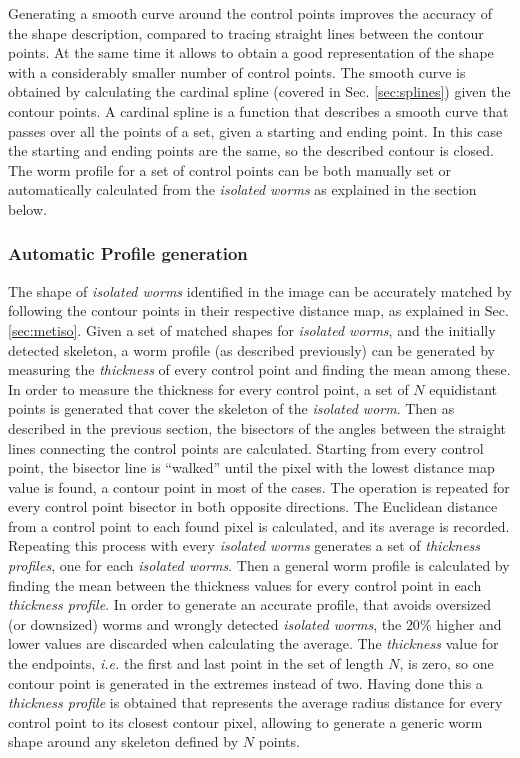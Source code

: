 Generating a smooth curve around the control points improves the accuracy of the shape
description, compared to tracing straight lines
between the contour points. At the same time it allows to obtain a good representation
of the shape with a considerably smaller number of control points. The smooth curve
is obtained by calculating the cardinal spline (covered in Sec. \ref{sec:splines}) given the
contour points. A cardinal spline is a function that describes a smooth curve that
passes over all the points of a set, given a starting and ending point. In this case
the starting and ending points are the same, so the described contour is closed.\\

The worm profile for a set of control points can be both manually set or automatically
calculated from the \emph{isolated worms} as explained in the section below.

\subsubsection{Automatic Profile generation}
\label{sec:metwormprof}

The shape of \emph{isolated worms} identified in the image can be accurately matched
by following the contour points in their respective distance map, as explained 
in Sec. \ref{sec:metiso}. Given a set of matched shapes for \emph{isolated worms}, and
the initially detected skeleton, a worm profile (as described previously) can be 
generated by measuring the \emph{thickness} of every control point and finding the mean
among these.\\

In order to measure the thickness for every control point, a set of
$N$ equidistant points is generated that cover the skeleton of the \emph{isolated worm}.
Then as described in the previous section, the bisectors of the angles between the 
straight lines connecting the control points are calculated. Starting from every control
point, the bisector line is ``walked'' until the pixel with the lowest distance map
value is found, a contour point in most of the cases. The operation is repeated for every 
control point bisector in both opposite directions. The Euclidean distance from a control
point to each found pixel is calculated, and its average is recorded. Repeating this process
with every  \emph{isolated worms} generates a set of \emph{thickness profiles}, one for each
\emph{isolated worms}. Then a general worm profile is calculated by finding the mean between
the thickness values for every control point in each \emph{thickness profile}. In order 
to generate an accurate profile, that avoids oversized (or downsized) worms and wrongly
detected \emph{isolated worms}, the $20\%$ higher and lower values are discarded when 
calculating the average. The \emph{thickness} value for
the endpoints, \emph{i.e.} the first and last point in the set of length $N$, is zero,
so one contour point is generated in the extremes instead of two.
Having done this a \emph{thickness profile} is obtained that represents the average 
radius distance for every control point to its closest contour pixel, allowing 
to generate a generic worm shape around any skeleton defined by $N$ points. 

